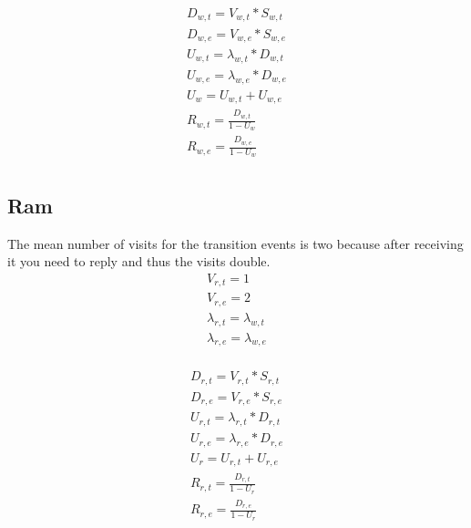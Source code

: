 \documentclass[11pt]{article}
\begin{document}
\begin{equation}
    \begin{array}{l}
        D_{w, t} = V_{w, t} * S_{w, t} \\
        D_{w, e} = V_{w, e} * S_{w, e} \\
        U_{w, t} = \lambda_{w, t} * D_{w, t} \\
        U_{w, e} = \lambda_{w, e} * D_{w, e} \\
        U_{w} = U_{w, t} + U_{w, e} \\
        R_{w, t} = \frac{D_{w, t}}{1 - U_{w}} \\
        R_{w, e} = \frac{D_{w, e}}{1 - U_{w}} \\
    \end{array}
\end{equation}

\subsection{Ram}
The mean number of visits for the transition events is two because after receiving it you need to reply and thus the visits double.
\begin{equation}
    \begin{array}{l}
        V_{r, t} = 1 \\
        V_{r, e} = 2 \\ %
        \lambda_{r, t} = \lambda_{w, t} \\
        \lambda_{r, e} = \lambda_{w, e} \\
    \end{array}
\end{equation}

\begin{equation}
    \begin{array}{l}
        D_{r, t} = V_{r, t} * S_{r, t} \\
        D_{r, e} = V_{r, e} * S_{r, e} \\
        U_{r, t} = \lambda_{r, t} * D_{r, t} \\
        U_{r, e} = \lambda_{r, e} * D_{r, e} \\
        U_{r} = U_{r, t} + U_{r, e} \\
        R_{r, t} = \frac{D_{r, t}}{1 - U_{r}} \\
        R_{r, e} = \frac{D_{r, e}}{1 - U_{r}} \\
    \end{array}
\end{equation}
\end{document}
